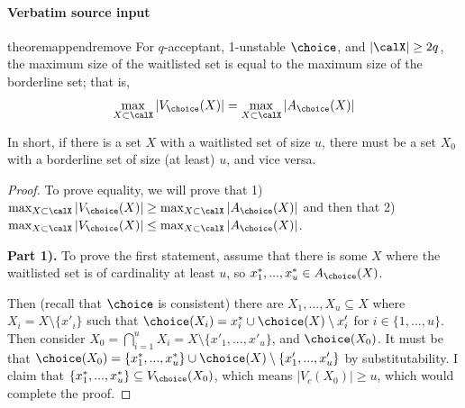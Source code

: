 \documentclass[10pt]{article}
\begin{document}
\paragraph{Verbatim source input}
\begin{ReviewVerbatim}
\begin{restatable}{theorem}{appendremove}
\label{thm:append-remove-size}
For $q$-acceptant, 1-unstable $\choice$, and $|\calX| \geq 2q$, the maximum size of the waitlisted set is equal to the maximum size of the borderline set; that is,
\begin{equation}
\max_{X\subset \calX} \left| V_\choice(X)\right| = \max_{X\subset \calX} \left| A_\choice(X)\right|
\end{equation}
\end{restatable}

In short, if there is a set $X$ with a waitlisted set of size $u$, there must be a set $X_0$ with a borderline set of size (at least) $u$, and vice versa. %

\begin{proof}
To prove equality, we will prove that 1) $\max_{X\subset \calX} \left| V_\choice(X)\right| \geq \max_{X\subset \calX} \left| A_\choice(X)\right|$ and then that 2) $\max_{X\subset \calX} \left| V_\choice(X)\right| \leq  \max_{X\subset \calX} \left| A_\choice(X)\right|$.

\textbf{Part 1).}
To prove the first statement, assume that there is some $X$ where the waitlisted set is of cardinality at least $u$, so $x^*_1, ..., x^*_u \in A_\choice(X)$.

Then (recall that $\choice$ is consistent) there are $X_1, ..., X_u \subseteq X$ where $X_i = X \setminus \{x'_i\}$ such that $\choice(X_i) = x^*_i \cup \choice(X) \setminus x'_i$ for $i \in \{1, ..., u\}$. Then consider $X_0 = \bigcap_{i=1}^u X_i = X \setminus \{x'_1, ..., x'_u\}$, and $\choice(X_0)$. It must be that $\choice(X_0) = \{x^*_1, ..., x^*_u\} \cup \choice(X) \setminus \{x'_1, ..., x'_u\}$ by substitutability. I claim that $\{x^*_1, ..., x^*_u\} \subseteq V_\choice(X_0)$, which means $|V_c(X_0)| \geq u$, which would complete the proof.


\end{proof}
\end{ReviewVerbatim}
\end{document}
